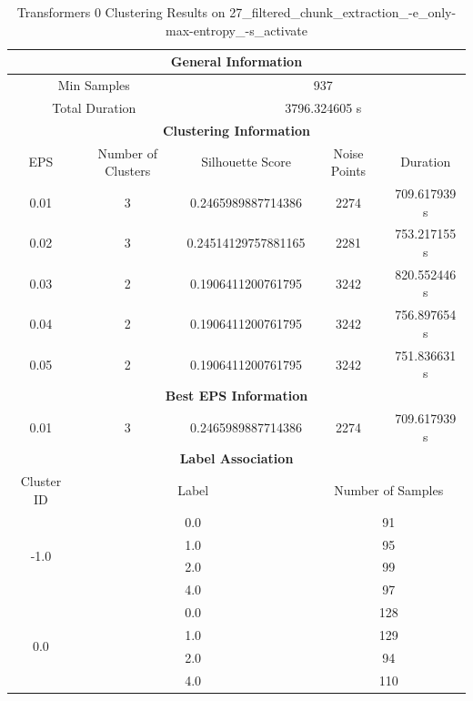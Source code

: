 \begin{longtable}{|c|c|c|c|c|}
\caption{Transformers 0 Clustering Results on 27\_filtered\_chunk\_extraction\_-e\_only-max-entropy\_-s\_activate} \label{tab:27_filtered_chunk_extraction_-e_only-max-entropy_-s_activate_transformers_0_clustering_results}\\
\hline
\multicolumn{5}{|c|}{\textbf{General Information}} \\
\hline
\multicolumn{2}{|c|}{Min Samples} & \multicolumn{3}{c|}{937} \\
\multicolumn{2}{|c|}{Total Duration} & \multicolumn{3}{c|}{3796.324605 s} \\
\hline
\multicolumn{5}{|c|}{\textbf{Clustering Information}} \\
\hline
EPS & Number of Clusters & Silhouette Score & Noise Points & Duration \\
0.01 & 3 & 0.2465989887714386 & 2274 & 709.617939 s\\
0.02 & 3 & 0.24514129757881165 & 2281 & 753.217155 s\\
0.03 & 2 & 0.1906411200761795 & 3242 & 820.552446 s\\
0.04 & 2 & 0.1906411200761795 & 3242 & 756.897654 s\\
0.05 & 2 & 0.1906411200761795 & 3242 & 751.836631 s\\
\hline
\multicolumn{5}{|c|}{\textbf{Best EPS Information}} \\
\hline
0.01 & 3 & 0.2465989887714386 & 2274 & 709.617939 s\\
\hline
\multicolumn{5}{|c|}{\textbf{Label Association}} \\
\hline
Cluster ID & \multicolumn{2}{c|}{Label} & \multicolumn{2}{c|}{Number of Samples} \\
\hline
\multirow{4}{*}{-1.0} & \multicolumn{2}{c|}{0.0} & \multicolumn{2}{c|}{91} \\
& \multicolumn{2}{c|}{1.0} & \multicolumn{2}{c|}{95} \\
& \multicolumn{2}{c|}{2.0} & \multicolumn{2}{c|}{99} \\
& \multicolumn{2}{c|}{4.0} & \multicolumn{2}{c|}{97} \\
\hline
\multirow{4}{*}{0.0} & \multicolumn{2}{c|}{0.0} & \multicolumn{2}{c|}{128} \\
& \multicolumn{2}{c|}{1.0} & \multicolumn{2}{c|}{129} \\
& \multicolumn{2}{c|}{2.0} & \multicolumn{2}{c|}{94} \\
& \multicolumn{2}{c|}{4.0} & \multicolumn{2}{c|}{110} \\

\end{longtable}
